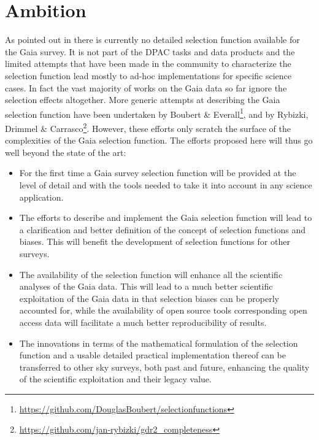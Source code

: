 \section{Ambition}
\label{sec:ambition}

As pointed out in  there is currently no detailed selection function available for the Gaia survey. It is not part of the DPAC tasks and data products and the limited attempts that have been made in the community to characterize the selection function lead mostly to ad-hoc implementations for specific science cases. In fact the vast majority of works on the Gaia data so far ignore the selection effects altogether. More generic attempts at describing the Gaia selection function have been undertaken by Boubert \& Everall\footnote{\url{https://github.com/DouglasBoubert/selectionfunctions}}, and by Rybizki, Drimmel \& Carrasco\footnote{\url{https://github.com/jan-rybizki/gdr2_completeness}}. However, these efforts only scratch the surface of the complexities of the Gaia selection function. The efforts proposed here will thus go well beyond the state of the art:
\begin{itemize}
    \item For the first time a Gaia survey selection function will be provided at the level of detail and with the tools needed to take it into account in any science application.
    \item The efforts to describe and implement the Gaia selection function will lead to a clarification and better definition of the concept of selection functions and biases. This will benefit the development of selection functions for other surveys.
    \item The availability of the selection function will enhance all the scientific analyses of the Gaia data. This will lead to a much better scientific exploitation of the Gaia data in that selection biases can be properly accounted for, while the availability of open source tools corresponding open access data will facilitate a much better reproducibility of results.
    \item The innovations in terms of the mathematical formulation of the selection function and a usable detailed practical implementation thereof can be transferred to other sky surveys, both past and future, enhancing the quality of the scientific exploitation and their legacy value.
\end{itemize}

